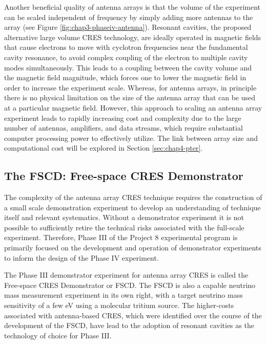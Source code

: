 Another beneficial quality of antenna arrays is that the volume of the experiment can be scaled independent of frequency by simply adding more antennas to the array (see Figure \ref{fig:chap3-phaseiv-antenna}). Resonant cavities, the proposed alternative large volume CRES technology, are ideally operated in magnetic fields that cause electrons to move with cyclotron frequencies near the fundamental cavity resonance, to avoid complex coupling of the electron to multiple cavity modes simultaneously. This leads to a coupling between the cavity volume and the magnetic field magnitude, which forces one to lower the magnetic field in order to increase the experiment scale. Whereas, for antenna arrays, in principle there is no physical limitation on the size of the antenna array that can be used at a particular magnetic field. However, this approach to scaling an antenna array experiment leads to rapidly increasing cost and complexity due to the large number of antennas, amplifiers, and data streams, which require substantial computer processing power to effectively utilize. The link between array size and computational cost will be explored in Section \ref{sec:chap4-pter}.

\subsection{The FSCD: Free-space CRES Demonstrator}
\label{sec:chap3-fscd}

The complexity of the antenna array CRES technique requires the construction of a small scale demonstration experiment to develop an understanding of technique itself and relevant systematics. Without a demonstrator experiment it is not possible to sufficiently retire the technical risks associated with the full-scale experiment. Therefore, Phase III of the Project 8 experimental program is primarily focused on the development and operation of demonstrator experiments to inform the design of the Phase IV experiment.

The Phase III demonstrator experiment for antenna array CRES is called the Free-space CRES Demonstrator or FSCD. The FSCD is also a capable neutrino mass measurement experiment in its own right, with a target neutrino mass sensitivity of a few eV using a molecular tritium source. The higher-costs associated with antenna-based CRES, which were identified over the course of the development of the FSCD, have lead to the adoption of resonant cavities as the technology of choice for Phase III.%

